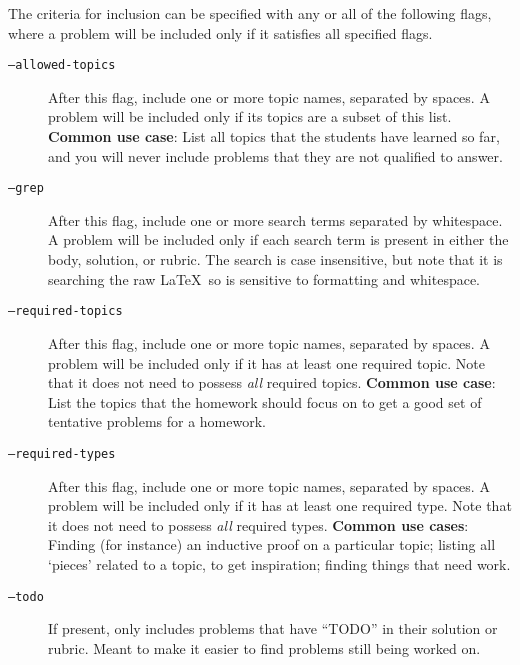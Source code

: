     The criteria for inclusion can be specified with any or all of the following flags, where a problem will be included only if it satisfies all specified flags.
    \begin{description}
      \item[\texttt{--allowed-topics}] After this flag, include one or more topic names, separated by spaces. A problem will be included only if its topics are a subset of this list. \textbf{Common use case}: List all topics that the students have learned so far, and you will never include problems that they are not qualified to answer.
      \item[\texttt{--grep}] After this flag, include one or more search terms separated by whitespace. A problem will be included only if each search term is present in either the body, solution, or rubric. The search is case insensitive, but note that it is searching the raw \LaTeX\ so is sensitive to formatting and whitespace.
      \item[\texttt{--required-topics}] After this flag, include one or more topic names, separated by spaces. A problem will be included only if it has at least one required topic. Note that it does not need to possess \textit{all} required topics. \textbf{Common use case}: List the topics that the homework should focus on to get a good set of tentative problems for a homework.
      \item[\texttt{--required-types}] After this flag, include one or more topic names, separated by spaces. A problem will be included only if it has at least one required type. Note that it does not need to possess \textit{all} required types. \textbf{Common use cases}: Finding (for instance) an inductive proof on a particular topic; listing all `pieces' related to a topic, to get inspiration; finding things that need work.
      \item[\texttt{--todo}] If present, only includes problems that have ``TODO'' in their solution or rubric. Meant to make it easier to find problems still being worked on.
    \end{description}
